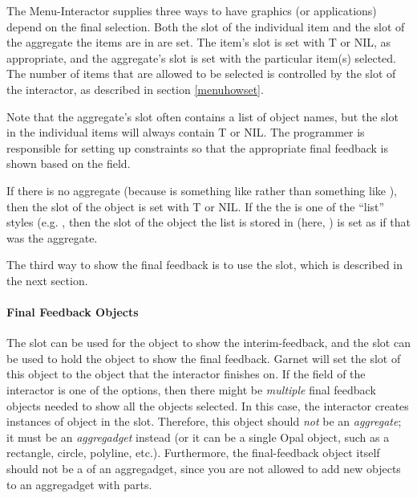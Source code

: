 The Menu-Interactor supplies three ways to have graphics (or applications)
depend on the final selection.  Both the  slot of the
individual item and the  slot of the aggregate
the items are in are set.  The item's  slot is set with T or NIL, as
appropriate, and the aggregate's  slot is set with the
particular item(s) selected.  The number of items that are
allowed to be selected is controlled by the  slot of the
interactor, as described in section \ref{menuhowset}.

Note that the aggregate's  slot often contains a list of
object names, but the  slot in the individual items will
always contain T or NIL.
The programmer is responsible for setting up constraints so that the
appropriate final feedback is shown based on the  field.

If there is no aggregate (because  is
something like  rather than something
like ), then the slot of the object is set with T or
NIL.  If the the  is one of the ``list'' styles (e.g.
, then the
 slot of the object the list is stored in (here, ) is
set as if that was the aggregate.

The third way to show the final feedback is to use the
 slot, which is described in the next section.

\paragraph{Final Feedback Objects}
\label{menufinalfeedbackobj}

The  slot can be used for the object to show the
interim-feedback, and the  slot can be used to hold
the object to show the final feedback.  Garnet will set the  slot
of this object to the object that the interactor finishes on.  If the
 field of the interactor is one of the  options,
then there might be {\it multiple} final feedback objects needed to show all
the objects selected.  In this case, the interactor creates instances of
object in the  slot.  Therefore, this object should
{\it not} be an {\it aggregate}; it must be an {\it aggregadget} instead (or
it can be a
single Opal object, such as a rectangle, circle, polyline, etc.).
Furthermore, the
final-feedback object itself should not be a  of an aggregadget,
since you are not allowed to add new objects to an aggregadget with parts.

